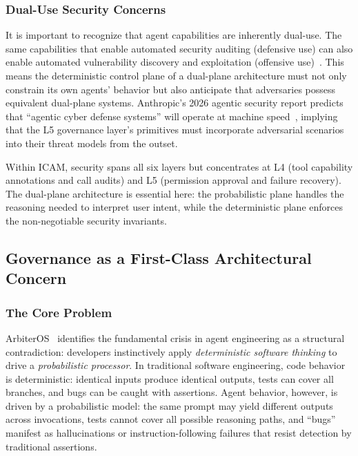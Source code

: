 \documentclass[11pt,a4paper]{article}
\begin{document}
\subsubsection{Dual-Use Security Concerns}
It is important to recognize that agent capabilities are inherently dual-use.
The same capabilities that enable automated security auditing (defensive use) can also enable automated vulnerability discovery and exploitation (offensive use)~\cite{anthropic2026agenticreport}.
This means the deterministic control plane of a dual-plane architecture must not only constrain its own agents' behavior but also anticipate that adversaries possess equivalent dual-plane systems.
Anthropic's 2026 agentic security report predicts that ``agentic cyber defense systems'' will operate at machine speed~\cite{anthropic2026agenticreport}, implying that the L5 governance layer's primitives must incorporate adversarial scenarios into their threat models from the outset.

Within ICAM, security spans all six layers but concentrates at L4 (tool capability annotations and call audits) and L5 (permission approval and failure recovery).
The dual-plane architecture is essential here: the probabilistic plane handles the reasoning needed to interpret user intent, while the deterministic plane enforces the non-negotiable security invariants.


\subsection{Governance as a First-Class Architectural Concern}

\subsubsection{The Core Problem}
ArbiterOS~\cite{arbiteros2025} identifies the fundamental crisis in agent engineering as a structural contradiction: developers instinctively apply \emph{deterministic software thinking} to drive a \emph{probabilistic processor}.
In traditional software engineering, code behavior is deterministic: identical inputs produce identical outputs, tests can cover all branches, and bugs can be caught with assertions.
Agent behavior, however, is driven by a probabilistic model: the same prompt may yield different outputs across invocations, tests cannot cover all possible reasoning paths, and ``bugs'' manifest as hallucinations or instruction-following failures that resist detection by traditional assertions.
\end{document}
